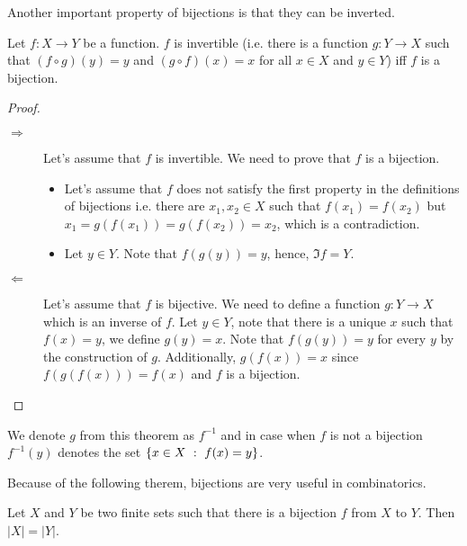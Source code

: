 Another important property of bijections is that they can be inverted.
\begin{theorem}
\label{theorem:inverse-of-bijections}
    Let $f : X \to Y$ be a function. $f$ is invertible (i.e. there is a function
    $g : Y \to X$ such that $(f \circ g)(y) = y$ and $(g \circ f)(x) = x$ for all
    $x \in X$ and $y \in Y$) iff $f$ is a bijection.
\end{theorem}
\begin{proof}
    \begin{description}
        \item[$\Rightarrow$] Let's assume that $f$ is invertible. We need to prove
            that $f$ is a bijection.
            \begin{itemize}
                \item Let's assume that $f$ does not satisfy the first property in the
                    definitions of bijections i.e. there are
                    $x_1, x_2 \in X$ such that $f(x_1) = f(x_2)$ but
                    $x_1 = g(f(x_1)) = g(f(x_2)) = x_2$, which is a
                    contradiction.
                \item Let $y \in Y$. Note that $f(g(y)) = y$, hence,
                    $\Im f = Y$.
            \end{itemize}

        \item[$\Leftarrow$] Let's assume that $f$ is bijective. We need to define a
            function $g : Y \to X$ which is an inverse of $f$. Let $y \in Y$, note
            that there is a unique $x$ such that $f(x) = y$, we define $g(y) = x$.
            Note that $f(g(y)) = y$ for every $y$ by the construction of $g$.
            Additionally, $g(f(x)) = x$ since $f(g(f(x))) = f(x)$ and $f$ is a
            bijection.
    \end{description}
\end{proof}
\noindent We denote $g$ from this theorem as $f^{-1}$ and in case when $f$ is
not a bijection $f^{-1}(y)$ denotes the set $\set[f(x) = y]{x \in X}$.

Because of the following therem, bijections are very useful in combinatorics.
\begin{theorem}
\label{theorem:bijection-to-equality}
    Let $X$ and $Y$ be two finite sets such that there is a bijection $f$ from
    $X$ to $Y$. Then $|X| = |Y|$.
\end{theorem}

